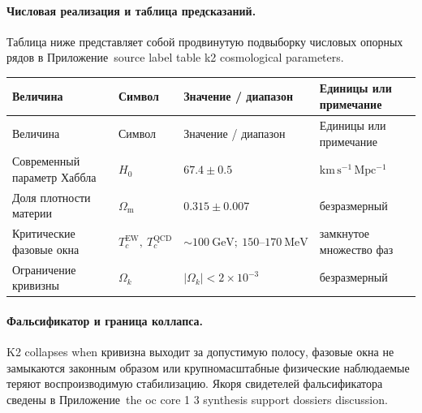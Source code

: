 \paragraph{Числовая реализация и таблица предсказаний.}
Таблица ниже представляет собой продвинутую подвыборку числовых опорных рядов в Приложение~source label table k2 cosmological parameters.
\begin{longtable}{@{}L{0.27\textwidth}L{0.15\textwidth}L{0.24\textwidth}L{0.16\textwidth}@{}}
\toprule
Величина & Символ & Значение / диапазон & Единицы или примечание \\
\midrule
\endfirsthead
\toprule
Величина & Символ & Значение / диапазон & Единицы или примечание \\
\midrule
\endhead
Современный параметр Хаббла & $\scriptstyle H_0$ & $67.4 \pm 0.5$ & $\mathrm{km\,s^{-1}\,Mpc^{-1}}$ \\
Доля плотности материи & $\scriptstyle \Omega_{\mathrm{m}}$ & $0.315 \pm 0.007$ & безразмерный \\
Критические фазовые окна & $\scriptstyle T_c^{\mathrm{EW}},\allowbreak \ T_c^{\mathrm{QCD}}$ & $\sim 100\ \mathrm{GeV};\allowbreak \ 150\text{--}170\ \mathrm{MeV}$ & замкнутое множество фаз \\
Ограничение кривизны & $\scriptstyle \Omega_k$ & $|\Omega_k| < 2 \times 10^{-3}$ & безразмерный \\
\bottomrule
\end{longtable}

\paragraph{Фальсификатор и граница коллапса.}
K2 collapses when кривизна выходит за допустимую полосу, фазовые окна не замыкаются законным образом или крупномасштабные физические наблюдаемые теряют воспроизводимую стабилизацию.
Якоря свидетелей фальсификатора сведены в Приложение~the oc core 1 3 synthesis support dossiers discussion.

